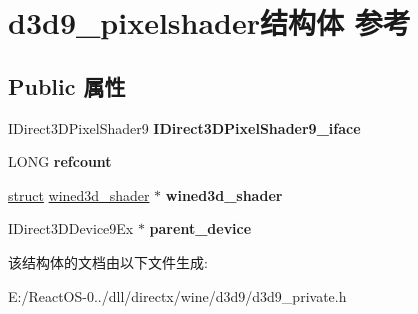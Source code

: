 \hypertarget{structd3d9__pixelshader}{}\section{d3d9\+\_\+pixelshader结构体 参考}
\label{structd3d9__pixelshader}
\subsection*{Public 属性}
\begin{DoxyCompactItemize}
\item 
\mbox{\label{structd3d9__pixelshader_a49b88c77becd9ddd8a15c7c454fb2e41}} 
I\+Direct3\+D\+Pixel\+Shader9 {\bfseries I\+Direct3\+D\+Pixel\+Shader9\+\_\+iface}
\item 
\mbox{\label{structd3d9__pixelshader_a7c1ca49b11bbdb914f0157d2640a16bc}} 
L\+O\+NG {\bfseries refcount}
\item 
\mbox{\label{structd3d9__pixelshader_a065b63979b1fe630b70db54ec21b8ef3}} 
\hyperlink{interfacestruct}{struct} \hyperlink{structwined3d__shader}{wined3d\+\_\+shader} $\ast$ {\bfseries wined3d\+\_\+shader}
\item 
\mbox{\label{structd3d9__pixelshader_a2aed49bae50eeab954e07a934a7703dc}} 
I\+Direct3\+D\+Device9\+Ex $\ast$ {\bfseries parent\+\_\+device}
\end{DoxyCompactItemize}


该结构体的文档由以下文件生成\+:\begin{DoxyCompactItemize}
\item 
E\+:/\+React\+O\+S-\/0../dll/directx/wine/d3d9/d3d9\+\_\+private.\+h\end{DoxyCompactItemize}
